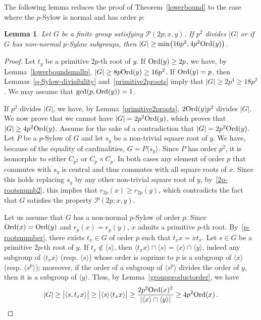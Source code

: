 \documentclass[12pt]{amsart}
\numberwithin{equation}{section}
\newcommand{\Ord}{{\rm Ord}}
\newtheorem{lem}[X]{Lemma}
\theoremstyle{definition}
\theoremstyle{remark}
\begin{document}
The following lemma reduces the proof of Theorem~\ref{lowerbound} to the case where the $p$-Sylow is normal and has order $p$:
\begin{lem}\label{nonnormalpsylow}
    Let $G$ be a finite group satisfying $\mathcal{P}(2p;x,y)$. If $p^2$ divides $|G|$ or if $G$ has non-normal $p$-Sylow subgroups, then $|G|\ge \min\bigl(16p^2, 4p^2\Ord(y)\bigr)$. 
\end{lem}
\begin{proof}
     Let $t_y$ be a primitive $2p$-th root of $y$. If $\Ord(y)\ge 2p$, we have, by Lemma~\ref{lowerboundsmallp}, $|G|\ge 8p\Ord(y)\ge 16p^2$. If $\Ord(y)=p$, then Lemmas~\ref{q-Sylow-divisibility} and~\ref{primitive2proots} imply that $|G|\ge 2p^4\ge 18p^2$. We may assume that $\gcd(p,\Ord(y))=1$.
     
     If $p^2$ divides $|G|$, we have, by Lemma~\ref{primitive2proots}, $2\Ord(y)p^2$ divides $|G|$. We now prove that we cannot have $|G|=2p^2\Ord(y)$, which proves that $|G|\ge 4p^2\Ord(y)$. Assume for the sake of a contradiction that $|G|=2p^2\Ord(y)$. Let $P$ be a $p$-Sylow of $G$ and let $s_y$ be a non-trivial square root of $y$. We have, because of the equality of cardinalities, $G=P\langle s_y\rangle$. Since $P$ has order $p^2$, it is isomorphic to either $C_{p^2}$ or $C_p\times C_p$. In both cases any element of order $p$ that commutes with $s_y$ is central and thus commutes with all square roots of $x$. Since this holds replacing $s_y$ by any other non-trivial square root of $y$, by~\eqref{2p-rootsnumb2}, this implies that $r_{2p}(x)\ge r_{2p}(y)$, which contradicts the fact that $G$ satisfies the property $\mathcal{P}(2p;x,y)$.
    
    Let us assume that $G$ has a non-normal $p$-Sylow of order $p$. Since $\Ord(x)=\Ord(y)$ and $r_p(x)=r_p(y)$, $x$ admits a primitive $p$-th root. By~\eqref{p-rootsnumber}, there exists $t_x\in G$ of order $p$ such that $t_x x=xt_x$. Let $s\in G$ be a primitive $2p$-th root of $y$. If $t_x\notin \langle s\rangle$, then $\langle t_x x\rangle\cap \langle s\rangle=\langle x\rangle\cap\langle y\rangle$, indeed any subgroup of $\langle t_x x\rangle$ (resp. $\langle s\rangle$) whose order is coprime to $p$ is a subgroup of $\langle x\rangle$ (resp. $\langle s^p\rangle$); moreover, if the order of a subgroup of $\langle s^p\rangle$ divides the order of $y$, then it is a subgroup of $\langle y\rangle$. Thus, by Lemma~\ref{groupproductorder}, we have \[|G|\ge\bigl| \langle s, t_x x\rangle\bigr|\ge \bigl|\langle s\rangle \langle t_x x\rangle\bigr|\ge \frac{2p^2\Ord(x)^2}{|\langle x\rangle\cap\langle y\rangle|}\ge4p^2\Ord(x)\, . \]\end{proof}
\end{document}
